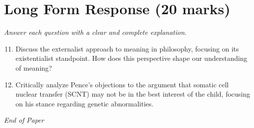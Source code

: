 \documentclass[12pt]{article}
\begin{document}
\section*{Long Form Response (20 marks)}
\textit{Answer each question with a clear and complete explanation.}
\begin{enumerate}[label=\arabic*.]
\setcounter{enumi}{10}
\item Discuss the externalist approach to meaning in philosophy, focusing on its existentialist standpoint. How does this perspective shape our understanding of meaning?
\item Critically analyze Pence's objections to the argument that somatic cell nuclear transfer (SCNT) may not be in the best interest of the child, focusing on his stance regarding genetic abnormalities.
\end{enumerate}

\vfill
\noindent\textit{End of Paper}
\end{document}
